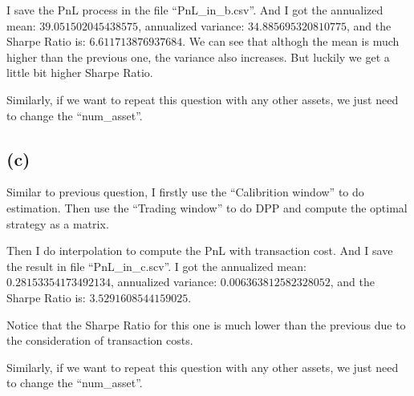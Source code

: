 \documentclass[letterpaper,11pt]{article}
\begin{document}
\begin{spacing}{1.2}
I save the PnL process in the file ``PnL\_in\_b.csv''. And I got the annualized mean: $39.051502045438575$, annualized variance: $34.885695320810775$, and the Sharpe Ratio is: $6.611713876937684$. We can see that althogh the mean is much higher than the previous one, the variance also increases. But luckily we get a little bit higher Sharpe Ratio.

Similarly, if we want to repeat this question with any other assets, we just need to change the ``num\_asset''.

\subsection*{(c)}
Similar to previous question, I firstly use the ``Calibrition window'' to do estimation. Then use the ``Trading window'' to do DPP and compute the optimal strategy as a matrix.

Then I do interpolation to compute the PnL with transaction cost. And I save the result in file ``PnL\_in\_c.scv''. I got the annualized mean: $0.28153354173492134$, annualized variance: $0.006363812582328052$, and the Sharpe Ratio is: $3.5291608544159025$.

Notice that the Sharpe Ratio for this one is much lower than the previous due to the consideration of transaction costs.

Similarly, if we want to repeat this question with any other assets, we just need to change the ``num\_asset''.

\end{spacing}
\end{document}
